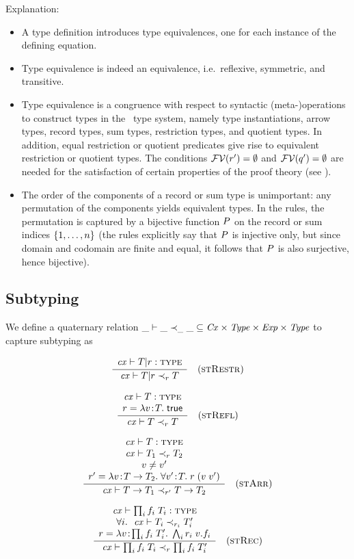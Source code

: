 Explanation:
\begin{itemize}
\item
A type definition introduces type equivalences, one for each instance of the
defining equation.
\item
Type equivalence is indeed an equivalence, i.e.\ reflexive, symmetric, and
transitive.
\item
Type equivalence is a congruence with respect to syntactic (meta-)operations
to construct types in the \MS\ type system, namely type instantiations, arrow
types, record types, sum types, restriction types, and quotient types. In
addition, equal restriction or quotient predicates give rise to equivalent
restriction or quotient types. The conditions $\mathcal{FV}(r')=\emptyset$ and
$\mathcal{FV}(q')=\emptyset$ are needed for the satisfaction of certain
properties of the proof theory (see ).
\item
The order of the components of a record or sum type is unimportant: any
permutation of the components yields equivalent types. In the rules, the
permutation is captured by a bijective function $P$ on the record or sum
indices $\{1,\ldots,n\}$ (the rules explicitly say that $P$ is injective
only, but since domain and codomain are finite and equal, it follows that
$P$ is also surjective, hence bijective).
\end{itemize}

\subsection{Subtyping}

We define a quaternary relation $\_\vdash\_\prec_{\_}\_\subseteq\mathit{Cx}\times\mathit{Type}\times\mathit{Exp}\times\mathit{Type}$ to
capture subtyping as

\[
\frac{\begin{array}{c}\mathit{cx}\vdash T|r:\textsc{type}\end{array}}{\mathit{cx}\vdash T|r\prec_{r}T}\quad\mbox{(\textsc{stRestr})}
\]

\[
\frac{\begin{array}{c}\mathit{cx}\vdash T:\textsc{type}\\r=\lambda v\!:\!T.\;\mathsf{true}\end{array}}{\mathit{cx}\vdash T\prec_{r}T}\quad\mbox{(\textsc{stRefl})}
\]

\[
\frac{\begin{array}{c}\mathit{cx}\vdash T:\textsc{type}\\\mathit{cx}\vdash T_1\prec_{r}T_2\\v\neq v'\\r'=\lambda v\!:\!T\to T_2.\;\forall v'\!:\!T.\;r\;(v\;v')\end{array}}{\mathit{cx}\vdash T\to T_1\prec_{r'}T\to T_2}\quad\mbox{(\textsc{stArr})}
\]

\[
\frac{\begin{array}{c}\mathit{cx}\vdash\prod_{i}f_i\;T_i:\textsc{type}\\\forall i.\ \ \mathit{cx}\vdash T_i\prec_{r_i}T_i'\\r=\lambda v\!:\!\prod_{i}f_i\;T_i'.\;\bigwedge_{i}r_i\;v.f_i\end{array}}{\mathit{cx}\vdash\prod_{i}f_i\;T_i\prec_{r}\prod_{i}f_i\;T_i'}\quad\mbox{(\textsc{stRec})}
\]


